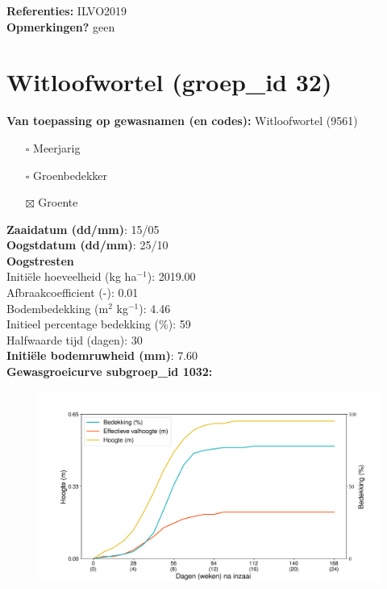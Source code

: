 \documentclass{article}
\begin{document}
  \textbf{Referenties:} ILVO2019 \vspace{0.10cm} \\ 
  \textbf{Opmerkingen?} geen \vspace{0.10cm} \\ 
 \newpage 
 \section{Witloofwortel (groep\_id 32)} 
 \textbf{Van toepassing op gewasnamen (en codes):} Witloofwortel (9561) 
 \begin{multicols}{3} \begin{itemize} \item[$\square$] Meerjarig \item[$\square$] Groenbedekker \item[$\boxtimes$] Groente \end{itemize} \end{multicols} 
  \textbf{Zaaidatum (dd/mm)}: 15/05  \vspace{0.10cm} \\ 
  \textbf{Oogstdatum (dd/mm)}: 25/10  \vspace{0.10cm} \\ 
  \textbf{Oogstresten} \vspace{0.05cm} \\ 
  \tab Initi\"{e}le hoeveelheid (kg ha$^{-1}$): 2019.00 \vspace{0.05cm} \\ 
  \tab Afbraakcoefficient (-): 0.01 \vspace{0.05cm} \\ 
  \tab Bodembedekking (m$^2$ kg$^{-1}$): 4.46 \vspace{0.05cm} \\ 
  \tab Initieel percentage bedekking (\%): 59 \vspace{0.05cm} \\ 
  \tab Halfwaarde tijd (dagen): 30 \vspace{0.05cm} \\ 
  \textbf{Initi\"{e}le bodemruwheid (mm)}: 7.60 \vspace{0.05cm} \\ 
  \textbf{Gewasgroeicurve subgroep\_id 1032:} 
 \begin{center} \begin{figure}[H] \includegraphics[width=12.5cm]{temp/1032.png} \end{figure} \end{center} 
\end{document}
